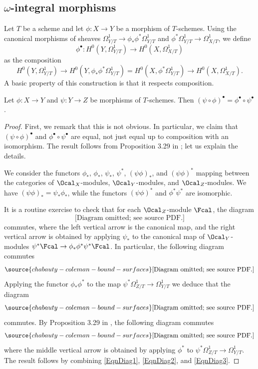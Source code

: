 \subsection{$\omega$-integral morphisms} Let $T$ be a scheme and let $\phi:X\to Y$ be a morphism of $T$-schemes. Using the canonical morphisms of sheaves $\Omega^1_{Y/T}\to \phi_*\phi^*\Omega^1_{Y/T}$ and $\phi^*\Omega^1_{Y/T}\to \Omega^1_{X/T}$, we define
$$
\phi^\bullet : H^0(Y,\Omega^1_{Y/T})\to H^0(X,\Omega^1_{X/T})
$$
as the composition
$$
H^0(Y,\Omega^1_{Y/T})\to H^0(Y,\phi_*\phi^*\Omega^1_{Y/T})=H^0(X,\phi^*\Omega^1_{Y/T})\to H^0(X,\Omega^1_{X/T}).
$$
A basic property of this construction is that it respects composition.
\begin{lemma}
\notready\label{LemmaCompositionInt} Let $\phi: X\to Y$ and $\psi: Y \to Z$ be morphisms of $T$-schemes. Then $(\psi\circ \phi)^\bullet = \phi^\bullet \circ \psi^\bullet$.
\end{lemma}
\begin{proof} First, we remark that this is not obvious. In particular, we claim that $(\psi\circ \phi)^\bullet$  and $\phi^\bullet \circ \psi^\bullet$ are equal, not just equal up to composition with an isomorphism. The result follows from Proposition 3.29 in \cite{GFthesis}; let us explain the details.

We consider the functors $\phi_*$, $\phi_*$, $\psi_*$, $\psi^*$, $(\psi\phi)_*$, and $(\psi\phi)^*$ mapping between the categories of $\Ocal_X$-modules, $\Ocal_Y$-modules, and $\Ocal_Z$-modules. We have $(\psi\phi)_*=\psi_*\phi_*$, while the functors $(\psi\phi)^*$ and $\phi^*\psi^*$ are isomorphic.

It is a routine exercise to check that for each $\Ocal_Z$-module $\Fcal$, the diagram
$$
\text{[Diagram omitted; see source PDF.]}
$$
commutes, where the left vertical arrow is the canonical map, and the right vertical arrow is obtained by applying $\psi_*$ to the canonical map of $\Ocal_Y$-modules $\psi^* \Fcal\to \phi_*\phi^*\psi^*\Fcal$. In particular, the following diagram commutes
\begin{equation}\label{EqnDiag1}
\source{chabauty-coleman-bound-surfaces}
\text{[Diagram omitted; see source PDF.]}
\end{equation}
Applying the functor $\phi_*\phi^*$ to the map $\psi^*\Omega^1_{Z/T}\to \Omega^1_{Y/T}$ we deduce that the diagram
\begin{equation}\label{EqnDiag2}
\source{chabauty-coleman-bound-surfaces}
\text{[Diagram omitted; see source PDF.]}
\end{equation}
commutes. By Proposition 3.29 in \cite{GFthesis}, the following diagram commutes
\begin{equation}\label{EqnDiag3}
\source{chabauty-coleman-bound-surfaces}
\text{[Diagram omitted; see source PDF.]}
\end{equation}
where the middle vertical arrow is obtained by applying $\phi^*$ to $\psi^*\Omega^1_{Z/T}\to \Omega^1_{Y/T}$. The result follows by combining \eqref{EqnDiag1}, \eqref{EqnDiag2}, and  \eqref{EqnDiag3}.
\end{proof}
